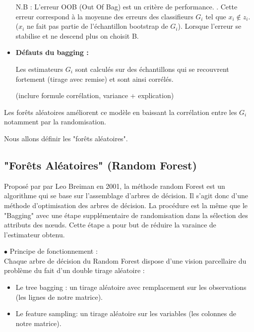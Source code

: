 \documentclass[11pt]{article}
\begin{document}
\begin{itemize}
N.B : L'erreur OOB (Out Of Bag) est un critère de performance.  . Cette erreur correspond à la moyenne des erreurs des classifieurs $G_{i}$ tel que $x_{i} \notin	z_{i}$. ($x_{i}$ ne fait pas partie de l'échantillon bootstrap de $G_{i}$). Lorsque l'erreur se stabilise et ne descend plus on choisit B.\par


\item \textbf{Défauts du bagging :}

Les estimateurs $G_{i}$ sont calculés sur des échantillons qui se recouvrent fortement (tirage avec remise) et sont ainsi corrélés.\par

(inclure formule corrélation, variance + explication)

\end{itemize}


Les forêts aléatoires améliorent ce modèle en baissant la corrélation entre les $G_{i}$ notamment par la randomisation.\par

Nous allons définir les "forêts aléatoires".

\subsection{"Forêts Aléatoires" (Random Forest)}

Proposé par par Leo Breiman en 2001, la méthode random Forest est un algorithme qui se base sur l’assemblage d’arbres de décision. Il s'agit donc d'une méthode d'optimisation des arbres de décision. La procédure est la même que le "Bagging" avec une étape supplémentaire de randomisation dans la sélection des attributs des nœuds. Cette étape a pour but de réduire la varaince de l'estimateur obtenu.\par


$\bullet$ Principe de fonctionnement : \\
Chaque arbre de décision du Random Forest dispose d'une vision parcellaire du problème du fait d'un double tirage aléatoire :

\begin{itemize}
    \item Le tree bagging : un tirage aléatoire avec remplacement sur les observations (les lignes de notre matrice).

    \item Le feature sampling: un tirage aléatoire sur les variables (les colonnes de notre matrice).
\end{itemize}
\end{document}
